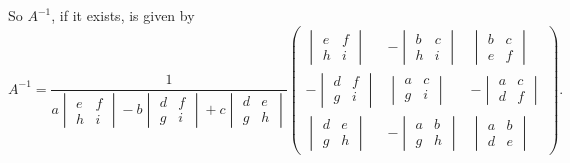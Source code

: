 \documentclass[a4paper]{article}
\begin{document}
    So \(A^{-1}\), if it exists, is given by
    \[
        A^{-1} = \frac{1}{
            a
            \begin{vmatrix}
                e & f\\
                h & i
            \end{vmatrix}
            - b
            \begin{vmatrix}
                d & f\\
                g & i
            \end{vmatrix}
            + c
            \begin{vmatrix}
                d & e\\
                g & h
            \end{vmatrix}
        }
        \begin{pmatrix}
            \begin{vmatrix}
                e & f\\
                h & i
            \end{vmatrix}
            & -
            \begin{vmatrix}
                b & c\\
                h & i
            \end{vmatrix}
            &
            \begin{vmatrix}
                b & c\\
                e & f
            \end{vmatrix}
            \\
            -
            \begin{vmatrix}
                d & f\\
                g & i
            \end{vmatrix}
            &
            \begin{vmatrix}
                a & c\\
                g & i
            \end{vmatrix}
            &
            -
            \begin{vmatrix}
                a & c\\
                d & f
            \end{vmatrix}
            \\
            \begin{vmatrix}
                d & e\\
                g & h
            \end{vmatrix}
            &
            -
            \begin{vmatrix}
                a & b\\
                g & h
            \end{vmatrix}
            &
            \begin{vmatrix}
                a & b\\
                d & e
            \end{vmatrix}
        \end{pmatrix}
        .
    \]
\end{document}
